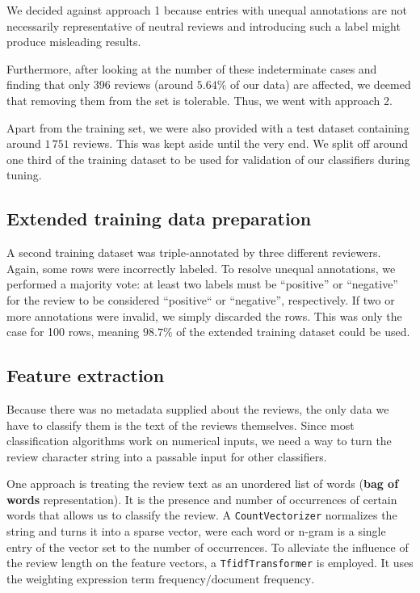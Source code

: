 \documentclass[11pt]{article}
\begin{document}
We decided against approach 1 because entries with unequal annotations are not necessarily representative of neutral reviews and introducing such a label might produce misleading results.

Furthermore, after looking at the number of these indeterminate cases and finding that only 396 reviews (around $5.64\%$ of our data) are affected, we deemed that removing them from the set is tolerable.
Thus, we went with approach 2.

Apart from the training set, we were also provided with a test dataset containing around $1\,751$ reviews.
This was kept aside until the very end.
We split off around one third of the training dataset to be used for validation of our classifiers during tuning.

\subsection{Extended training data preparation}
A second training dataset was triple-annotated by three different reviewers.
Again, some rows were incorrectly labeled.
To resolve unequal annotations, we performed a majority vote: at least two labels must be “positive” or “negative” for the review to be considered “positive“ or “negative”, respectively.
If two or more annotations were invalid, we simply discarded the rows.
This was only the case for 100 rows, meaning $98.7\%$ of the extended training dataset could be used.

\subsection{Feature extraction}

Because there was no metadata supplied about the reviews, the only data we have to classify them is the text of the reviews themselves.
Since most classification algorithms work on numerical inputs, we need a way to turn the review character string into a passable input for other classifiers.

One approach is treating the review text as an unordered list of words (\textbf{bag of words} representation). It is the presence and number of occurrences of certain words that allows us to classify the review.
A \texttt{CountVectorizer} normalizes the string and turns it into a sparse vector, were each word or n-gram is a single entry of the vector set to the number of occurrences.
To alleviate the influence of the review length on the feature vectors, a \texttt{TfidfTransformer} is employed. It uses the weighting expression $\textrm{term frequency} / \textrm{document frequency}$.
\end{document}
